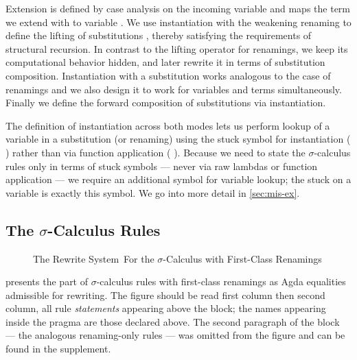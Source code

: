 \documentclass[a4paper,UKenglish,cleveref, autoref, thm-restate,anonymous]{lipics-v2021}
\begin{document}
Extension  is defined by case analysis on the incoming
variable and maps the term we extend with to variable
. We use instantiation with the weakening
renaming to define the lifting of substitutions , thereby
satisfying the requirements of structural recursion. In contrast to the lifting
operator for renamings, we keep its computational behavior hidden, and later
rewrite it in terms of substitution composition. Instantiation with a
substitution  works analogous to the case of renamings and
we also design it to work for variables and terms simultaneously. Finally we
define the forward composition of substitutions  via
instantiation.

The definition of instantiation across both modes lets us perform lookup of a
variable in a substitution (or renaming) using the stuck symbol for
instantiation (  ) rather than via
function application ( \AgdaBound{\_} ). Because we
need to state the $σ$-calculus rules only in terms of stuck symbols --- never
via raw lambdas or function application --- we require an additional symbol
for variable lookup; the stuck  on a variable is exactly
this symbol. We go into more detail in \cref{sec:mis-ex}.

\subsection{The $σ$-Calculus Rules}\label{sec:mis-sig}
\begin{figure}[t]
      \AgdaNoSpaceAroundCode{}
      \setlength{\mathindent}{0pt}
      \begin{minipage}[t]{0.48\linewidth}
            \raggedright{}
            \EDefLaws{}
            \EInteractLaws{}
            \ERewriteSys{}
      \end{minipage}
      \hfill
      \begin{minipage}[t]{0.48\linewidth}
            \raggedright{}
            \ECoincidenceLaws{}
            \ETraversalLaws{}
            \EMonadLaws{}
      \end{minipage}
      \caption{The Rewrite System~For the $σ$-Calculus with First-Class Renamings}\label{fig:mis-sig}
\end{figure}

 presents the part of $σ$-calculus rules with first-class
renamings as Agda equalities admissible for rewriting. The figure should be
read first column then second column, all rule \emph{statements} appearing
above the  block; the names appearing inside the
 pragma are those declared above. The second paragraph of
the  block --- the analogous renaming-only rules --- was
omitted from the figure and can be found in the supplement.
\end{document}
